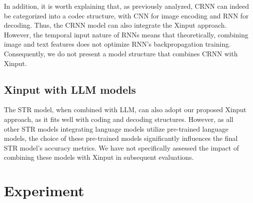 \documentclass[runningheads]{llncs}
\begin{document}
In addition, it is worth explaining that, as previously analyzed, CRNN can indeed be categorized into a codec structure, with CNN for image encoding and RNN for decoding.	Thus, the CRNN model can also integrate the Xinput approach.	However, the temporal input nature of RNNs means that theoretically, combining image and text features does not optimize RNN's backpropagation training.	Consequently, we do not present a model structure that combines CRNN with Xinput.	

\subsection{Xinput with LLM models}
The STR model, when combined with LLM, can also adopt our proposed Xinput approach, as it fits well with coding and decoding structures. However, as all other STR models integrating language models utilize pre-trained language models, the choice of these pre-trained models significantly influences the final STR model's accuracy metrics.	We have not specifically assessed the impact of combining these models with Xinput in subsequent evaluations.	

\section{Experiment}
\end{document}
